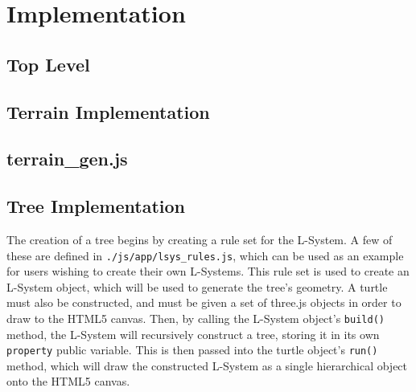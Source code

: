 \documentclass{article}
\newcommand{\tab}{\hspace*{2em}}
\begin{document}
    \section{Implementation}
        \subsection{Top Level}

        \subsection{Terrain Implementation}
            \subsection{terrain\_gen.js}
        \subsection{Tree Implementation}
    \tab The creation of a tree begins by creating a rule set for the L-System. A few of these are
defined in \verb|./js/app/lsys_rules.js|, which can be used as an example for users wishing to
create their own L-Systems. This rule set is used to create an L-System object, which will be used
to generate the tree's geometry. A turtle must also be constructed, and must be given a set of
three.js objects in order to draw to the HTML5 canvas. Then, by calling the L-System object's
\verb|build()| method, the L-System will recursively construct a tree, storing it in its own
\verb|property| public variable. This is then passed into the turtle object's \verb|run()| method,
which will draw the constructed L-System as a single hierarchical object onto the HTML5 canvas.
\end{document}
